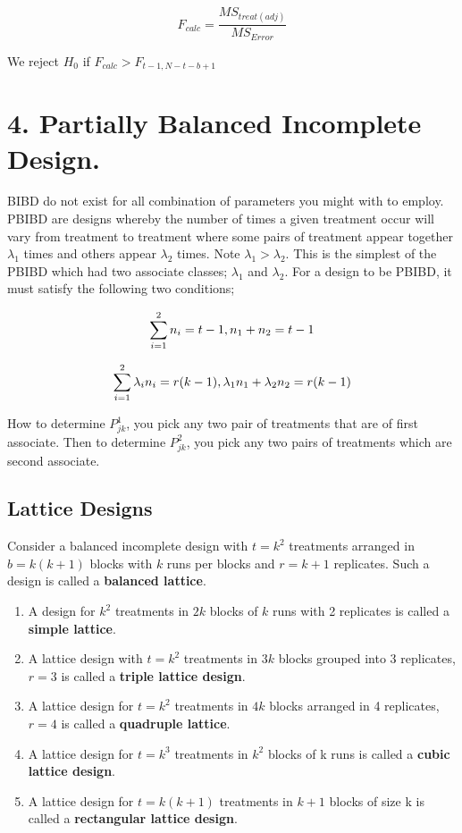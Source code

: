 \documentclass[
]{article}
\begin{document}
\[F_{calc}=\frac{MS_{treat(adj)}}{MS_{Error}}\]

We reject \(H_0\) if \(F_{calc}>F_{t-1,N-t-b+1}\)

\newpage

\hypertarget{partially-balanced-incomplete-design.}{%
\section{4. Partially Balanced Incomplete
Design.}\label{partially-balanced-incomplete-design.}}

BIBD do not exist for all combination of parameters you might with to
employ. PBIBD are designs whereby the number of times a given treatment
occur will vary from treatment to treatment where some pairs of
treatment appear together \(\lambda_1\) times and others appear
\(\lambda_2\) times. Note \(\lambda_1>\lambda_2\). This is the simplest
of the PBIBD which had two associate classes; \(\lambda_1\) and
\(\lambda_2\). For a design to be PBIBD, it must satisfy the following
two conditions;

\[\sum_{i=1}^2n_i=t-1,\space n_1+n_2=t-1\]

\[\sum_{i=1}^2\lambda_in_i=r(k-1), \space \lambda_1n_1+\lambda_2n_2=r(k-1)\]

How to determine \(P_{jk}^1\), you pick any two pair of treatments that
are of first associate. Then to determine \(P_{jk}^2\), you pick any two
pairs of treatments which are second associate.

\hypertarget{lattice-designs}{%
\subsection{Lattice Designs}\label{lattice-designs}}

Consider a balanced incomplete design with \(t=k^2\) treatments arranged
in \(b=k(k+1)\) blocks with \(k\) runs per blocks and \(r=k+1\)
replicates. Such a design is called a \textbf{balanced lattice}.

\begin{enumerate}
\def\labelenumi{\arabic{enumi}.}
\item
  A design for \(k^2\) treatments in \(2k\) blocks of \(k\) runs with 2
  replicates is called a \textbf{simple lattice}.
\item
  A lattice design with \(t=k^2\) treatments in \(3k\) blocks grouped
  into 3 replicates, \(r=3\) is called a \textbf{triple lattice design}.
\item
  A lattice design for \(t = k^2\) treatments in \(4k\) blocks arranged
  in 4 replicates, \(r=4\) is called a \textbf{quadruple lattice}.
\item
  A lattice design for \(t=k^3\) treatments in \(k^2\) blocks of k runs
  is called a \textbf{cubic lattice design}.
\item
  A lattice design for \(t=k(k+1)\) treatments in \(k+1\) blocks of size
  k is called a \textbf{rectangular lattice design}.
\end{enumerate}
\end{document}
